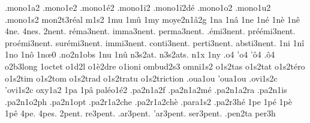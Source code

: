{ %
                    .mono1a2
                    .mono1e2
                    .mono1\'e2
                    .mono1i2
                    .mono1\"i2d\'e
                    .mono1o2
                    .mono1u2
                    .mono1s2
                    mon2t3r\'eal %
m1s2
1mu
1m\^u
1my
                    moye2n1\^a2g
1na
1n\^a
1ne
1n\'e
1n\`e
1n\^e
4ne.
4nes.
          2nent. %
    r\'ema3nent.
      imma3nent.
     perma3nent.
    .\'emi3nent.
pr\'e\'emi3nent.
  pro\'emi3nent.
  sur\'emi3nent.
      immi3nent.
     conti3nent.
     perti3nent.
     absti3nent.
%
1ni
1n\^i
1no
1n\^o
1n\oe0 %
                    .no2n1obs
1nu
1n\^u
                    n3s2at.
                    n3s2ats.
n1x
1ny
.o4
'o4
'\^o4
.\^o4
                    o2b3long
                    1octet %
                    o1d2l
                    o1\`e2dre
                    o1ioni
                    ombud2s3
                    omni1s2
                    o1s2tas
                    o1s2tat
                    o1s2t\'ero
                    o1s2tim
                    o1s2tom
                    o1s2trad
                    o1s2tratu
                    o1s2triction
                    .oua1ou
                    'oua1ou
                    .ovi1s2c
                    'ovi1s2c
                    oxy1a2
1pa
1p\^a
                    pal\'eo1\'e2
                    .pa2n1a2f
                    .pa2n1a2m\'e
                    .pa2n1a2ra
                    .pa2n1is
                    .pa2n1o2ph
                    .pa2n1opt
                    .pa2r1a2che
                    .pa2r1a2ch\`e
                    .para1s2
                    .pa2r3h\'e
1pe
1p\'e
1p\`e
1p\^e
4pe.
4pes.
   2pent.
 re3pent.
.ar3pent.
'ar3pent.
ser3pent.
%
                    .pen2ta %
                    per3h
}
